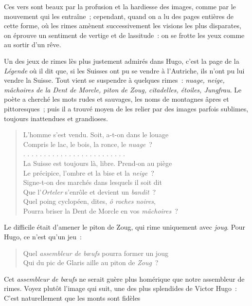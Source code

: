 \documentclass[french,twoside]{book} %
\begin{document}
\noindent Ces vers sont beaux par la profusion et la hardiesse des images, comme par le mouvement qui les entraîne ; cependant, quand on a lu des pages entières de cette forme, où les rimes amènent successivement les visions les plus disparates, on éprouve un sentiment de vertige et de lassitude : on se frotte les yeux comme au sortir d’un rêve.\par
Un des jeux de rimes lès plus justement admirés dans Hugo, c’est la page de la \emph{Légende} où il dit que, si les Suisses ont pu se vendre à l’Autriche, ils n’ont pu lui vendre la Suisse. Tout vient se suspendre à quelques rimes : \emph{ nuage, neige, mâchoires de la Dent de Morcle, piton de Zoug, citadelles, étoiles, Jungfrau}. Le poète a cherché les mots rudes et sauvages, les noms de montagnes âpres et pittoresques ; puis il a trouvé moyen de les relier par des images parfois sublimes, toujours inattendues et grandioses.\par


\begin{verse}
L’homme s’est vendu. Soit, a-t-on dans le louage\\
Compris le lac, le bois, la ronce, le \emph{nuage} ?\\
. . . . . . . . . . . . . . . . . . . . . . . . .\\
La Suisse est toujours là, libre. Prend-on au piège\\
Le précipice, l’ombre et la bise et la \emph{neige} ?\\
Signe-t-on des marchés dans lesquels il soit dit\\
Que l’\emph{Orteler} s’enrôle et devient un \emph{bandit} ?\\
Quel poing cyclopéen, dites, \emph{ô roches noires},\\
Pourra briser la Dent de Morcle en vos \emph{mâchoires} ?\\
\end{verse}

\noindent Le difficile était d’amener le piton de Zoug, qui rime uniquement avec \emph{joug}. Pour Hugo, ce n’est qu’un jeu :\par


\begin{verse}
Quel \emph{assembleur de bœufs} pourra former un joug\\
Qui du pic de Glaris aille au piton de \emph{Zoug} ?\\
\end{verse}

\noindent Cet \emph{assembleur de bœufs} ne serait guère plus homérique que notre assembleur de rimes. Voyez plutôt l’image qui suit, une des plus splendides de Victor Hugo : C’est naturellement que les monts sont fidèles\par
\end{document}
